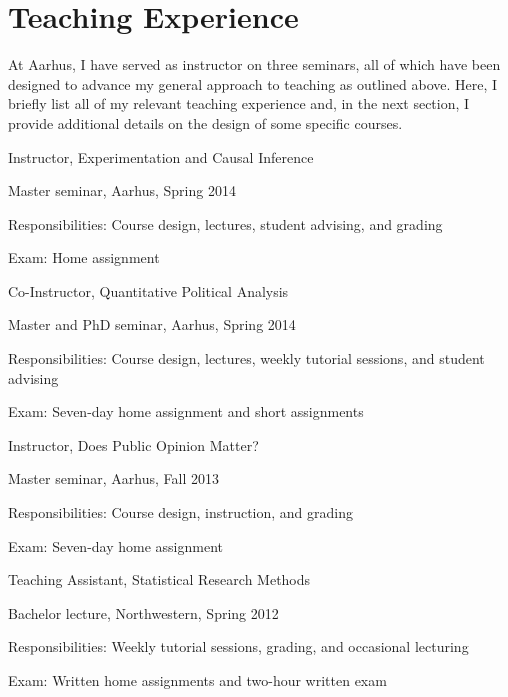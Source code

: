 \documentclass[12pt]{article}
\begin{document}
\clearpage

\section{Teaching Experience}

At Aarhus, I have served as instructor on three seminars, all of which have been designed to advance my general approach to teaching as outlined above. Here, I briefly list all of my relevant teaching experience and, in the next section, I provide additional details on the design of some specific courses.

\begin{itemize*}
\item Instructor, Experimentation and Causal Inference
	\begin{itemize*}
	\item Master seminar, Aarhus, Spring 2014
	\item Responsibilities: Course design, lectures, student advising, and grading
	\item Exam: Home assignment
	\end{itemize*}
\item Co-Instructor, Quantitative Political Analysis
	\begin{itemize*}
	\item Master and PhD seminar, Aarhus, Spring 2014
	\item Responsibilities: Course design, lectures, weekly tutorial sessions, and student advising
	\item Exam: Seven-day home assignment and short assignments
	\end{itemize*}
\item Instructor, Does Public Opinion Matter?
	\begin{itemize*}
	\item Master seminar, Aarhus, Fall 2013
	\item Responsibilities: Course design, instruction, and grading
	\item Exam: Seven-day home assignment
	\end{itemize*}
\item Teaching Assistant, Statistical Research Methods
	\begin{itemize*}
	\item Bachelor lecture, Northwestern, Spring 2012
	\item Responsibilities: Weekly tutorial sessions, grading, and occasional lecturing
	\item Exam: Written home assignments and two-hour written exam

\end{itemize*}
\end{itemize*}
\end{document}
